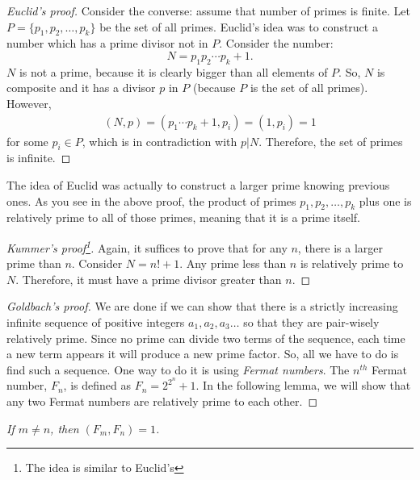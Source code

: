 \documentclass{subfiles}
\begin{document}
		\begin{proof}[Euclid's proof]
			Consider the converse: assume that number of primes is finite. Let $P=\{p_1,p_2,\ldots,p_k\}$ be the set of all primes. Euclid's idea was to construct a number which has a prime divisor not in $P$. Consider the number:
			\[N=p_1p_2\cdots p_k+1.\]
			$N$ is not a prime, because it is clearly bigger than all elements of $P$. So, $N$ is composite and it has a divisor $p$ in $P$ (because $P$ is the set of all primes). However,
				\begin{align}\label{eq:euclidprime}
					(N,p)=(p_1\cdots p_k+1,p_i)=(1,p_i)=1
				\end{align}
			for some $p_i \in P$, which is in contradiction with $p|N$. Therefore, the set of primes is infinite.
		\end{proof}

		\begin{note}
			The idea of Euclid was actually to construct a larger prime knowing previous ones. As you see in the above proof, the product of primes $p_1, p_2, \ldots, p_k$ plus one is relatively prime to all of those primes, meaning that it is a prime itself.
		\end{note}

		\begin{proof}[Kummer's proof\footnote{The idea is similar to Euclid's}]
			Again, it suffices to prove that for any $n$, there is a larger prime than $n$. Consider $N=n!+1$. Any prime less than $n$ is relatively prime to $N$. Therefore, it must have a prime divisor greater than $n$.
		\end{proof}

		\begin{proof}[Goldbach's proof]
			We are done if we can show that there is a strictly increasing infinite sequence of positive integers $a_1,a_2,a_3\ldots$ so that they are pair-wisely relatively prime. Since no prime can divide two terms of the sequence, each time a new term appears it will produce a new prime factor. So, all we have to do is find such a sequence. One way to do it is using \textit{Fermat numbers}. The $n^{th}$ Fermat number, $F_n$, is defined as $F_n=2^{2^n}+1$. In the following lemma, we will show that any two Fermat numbers are relatively prime to each other.
		\end{proof}

		\begin{lemma}\slshape
			If $m\neq n$, then $(F_m,F_n)=1$.\label{lem:fermatcp}
		\end{lemma}
\end{document}
